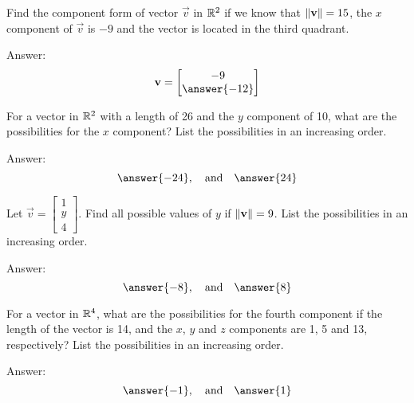 \documentclass{ximera}
\begin{document}
\begin{problem}\label{prob:compformgivenmag}
Find the component form of vector $\vec{v}$ in $\mathbb{R}^2$ if we know that $\left\lVert\mathbf{v}\right\rVert=15$, the $x$ component of $\vec{v}$ is $-9$ and the vector is located in the third quadrant.

Answer:
$$\vec{v}=\begin{bmatrix}-9\\\answer{-12}\end{bmatrix}$$
\end{problem}

\begin{problem}\label{prob:comppossibilities}
For a vector in $\mathbb{R}^2$ with a length of 26 and the $y$ component of 10, what are the possibilities for the $x$ component?  List the possibilities in an increasing order.

Answer:
$$\answer{-24},\quad\text{and}\quad\answer{24} $$
\end{problem}

\begin{problem}\label{prob:yvaluesgivennorm}
Let $\vec{v}=\begin{bmatrix}1\\ y\\ 4\end{bmatrix}$.  Find all possible values of $y$ if $\left\lVert\mathbf{v}\right\rVert=9$.  List the possibilities in an increasing order.

Answer:
$$\answer{-8},\quad\text{and}\quad\answer{8}$$
\end{problem}

\begin{problem}\label{prob:comppossibilitiesinr4}
For a vector in $\mathbb{R}^4$, what are the possibilities for the fourth component if the length of the vector is 14, and the $x$, $y$ and $z$ components are 1, 5 and 13, respectively? List the possibilities in an increasing order.

Answer:
$$\answer{-1},\quad\text{and}\quad\answer{1}$$
\end{problem}
 
 
\end{document}
